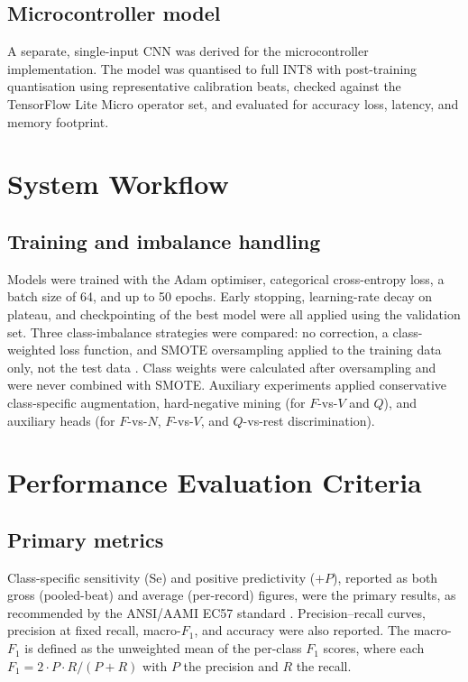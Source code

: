 \subsection{Microcontroller model}

A separate, single-input CNN was derived for the microcontroller
implementation. The model was quantised to full INT8 with
post-training quantisation using representative calibration beats, checked
against the TensorFlow Lite Micro operator set, and evaluated for accuracy
loss, latency, and memory footprint.


\section{System Workflow}
\label{sec:workflow}

\subsection{Training and imbalance handling}

Models were trained with the Adam optimiser, categorical cross-entropy
loss, a batch size of 64, and up to 50 epochs. Early stopping, learning-rate
decay on plateau, and checkpointing of the best model were all applied using
the validation set. Three class-imbalance strategies were compared: no
correction, a class-weighted loss function, and SMOTE oversampling applied
to the training data only, not the test data \cite{chawla2002smote}. Class
weights were calculated after oversampling and were never combined with
SMOTE. Auxiliary experiments applied conservative class-specific
augmentation, hard-negative mining (for $F$-vs-$V$ and $Q$), and auxiliary
heads (for $F$-vs-$N$, $F$-vs-$V$, and $Q$-vs-rest discrimination).


\section{Performance Evaluation Criteria}
\label{sec:eval_criteria}

\subsection{Primary metrics}

Class-specific sensitivity (Se) and positive predictivity ($+P$), reported
as both gross (pooled-beat) and average (per-record) figures, were the
primary results, as recommended by the ANSI/AAMI EC57 standard
\cite{aami_ec57_2012}. Precision--recall curves, precision at fixed recall,
macro-$F_1$, and accuracy were also reported. The macro-$F_1$ is defined as
the unweighted mean of the per-class $F_1$ scores, where each
$F_1 = 2 \cdot P \cdot R/(P + R)$ with $P$ the precision and $R$ the recall.

